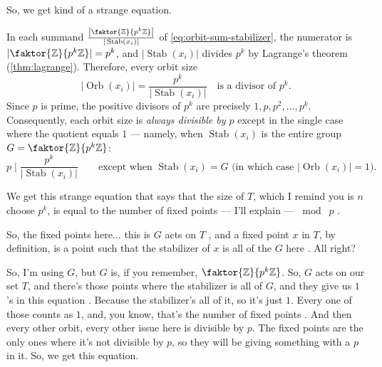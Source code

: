 \begin{proofWrapper}
\begin{speech}[00:41:53 - 00:42:32]
So, we get kind of a strange equation.
\end{speech}

\begin{content}
In each summand $\frac{\left|\faktor{\mathbb{Z}}{p^k\mathbb{Z}}\right|}{|\operatorname{Stab}(x_i)|}$ of \eqref{eq:orbit-sum-stabilizer}, the numerator is $|\faktor{\mathbb{Z}}{p^k\mathbb{Z}}| = p^k$, and $|\operatorname{Stab}(x_i)|$ divides $p^k$ by Lagrange's theorem (\cref{thm:lagrange}). Therefore, every orbit size
\[
|\operatorname{Orb}(x_i)| = \frac{p^k}{|\operatorname{Stab}(x_i)|} \quad \text{is a divisor of } p^k.
\]
Since $p$ is prime, the positive divisors of $p^k$ are precisely $1, p, p^2, \dots, p^k$. Consequently, each orbit size is \emph{always divisible by $p$} except in the single case where the quotient equals $1$ --- namely, when $\operatorname{Stab}(x_i)$ is the entire group $G = \faktor{\mathbb{Z}}{p^k\mathbb{Z}}$:
\[
p \;\Big|\; \frac{p^k}{|\operatorname{Stab}(x_i)|} \qquad \text{except when } \operatorname{Stab}(x_i) = G \text{ (in which case } |\operatorname{Orb}(x_i)| = 1\text{)}.
\]
\end{content}

\begin{speech}[00:43:03 - 00:45:00]
We get this strange equation that says that the size of $T$, which I remind you is $n$ choose $p^k$, is equal to the number of fixed points --- I'll explain --- $\bmod\; p$ .

So, the fixed points here... this is $G$ acts on $T$ , and a fixed point $x$ in $T$, by definition, is a point such that the stabilizer of $x$ is all of the $G$ here . All right?

So, I'm using $G$, but $G$ is, if you remember, $\faktor{\mathbb{Z}}{p^k\mathbb{Z}}$. So, $G$ acts on our set $T$, and there's those points where the stabilizer is all of $G$, and they give us $1$'s in this equation . Because the stabilizer's all of it, so it's just $1$. Every one of those counts as $1$, and, you know, that's the number of fixed points . And then every other orbit, every other issue here  is divisible by $p$. The fixed points are the only ones where it's not divisible by $p$, so they will be giving something with a $p$ in it. So, we get this equation.


\end{speech}
\end{proofWrapper}
